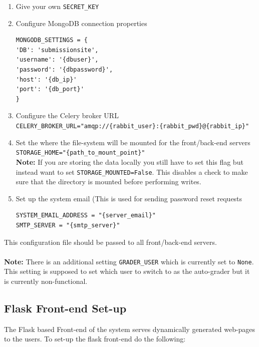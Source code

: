 \documentclass[11pt]{report}
\begin{document}
\begin{enumerate}
\item Give your own \verb|SECRET_KEY|
\item Configure MongoDB connection properties
\begin{verbatim}
MONGODB_SETTINGS = {
'DB': 'submissionsite',
'username': '{dbuser}',
'password': '{dbpassword}',
'host': '{db_ip}'
'port': '{db_port}'
}
\end{verbatim}
\item Configure the Celery broker URL\\
\verb|CELERY_BROKER_URL="amqp://{rabbit_user}:{rabbit_pwd}@{rabbit_ip}"|
\item Set the where the file-system will be mounted for the front/back-end servers\\
\verb|STORAGE_HOME="{path_to_mount_point}"|\\
\textbf{Note:} If you are storing the data locally you still have to set this flag but instead
want to set \verb|STORAGE_MOUNTED=False|. This disables a check to make sure that the directory is
mounted before performing writes.
\item Set up the system email (This is used for sending password reset requests
\begin{verbatim}
SYSTEM_EMAIL_ADDRESS = "{server_email}"
SMTP_SERVER = "{smtp_server}"
\end{verbatim}
\end{enumerate}

This configuration file should be passed to all front/back-end servers.
\\
\\
\noindent\textbf{Note:} There is an additional setting \verb|GRADER_USER| which is currently set to 
\verb|None|. This setting is supposed to set which user to switch to as the auto-grader but it
is currently non-functional.

\subsection{Flask Front-end Set-up}
The Flask based Front-end of the system serves dynamically generated web-pages to the users.
To set-up the flask front-end do the following:
\end{document}
